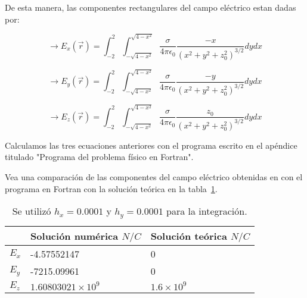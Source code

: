 De esta manera, las componentes rectangulares del campo eléctrico estan dadas por:

\begin{equation}
    \longrightarrow
    E_{x} (\vec{r}) =  
    \displaystyle\int_{-2}^{2} 
    \displaystyle\int_{- \sqrt{4 - x^2} }^{\sqrt{4 - x^2}}
    \frac{\sigma}{4\pi \epsilon_0}
    \frac{ -x }{\left( x^2 + y^2 + z_{0}^{2} \right)^{3/2}} dy dx
\end{equation}

\begin{equation}
    \longrightarrow
    E_{y} (\vec{r}) =  
    \displaystyle\int_{-2}^{2} 
    \displaystyle\int_{- \sqrt{4 - x^2} }^{\sqrt{4 - x^2}}
    \frac{\sigma}{4\pi \epsilon_0}
    \frac{ -y }{\left( x^2 + y^2 + z_{0}^{2} \right)^{3/2}} dy dx
\end{equation}

\begin{equation}
    \longrightarrow
    E_{z} (\vec{r}) =  
    \displaystyle\int_{-2}^{2} 
    \displaystyle\int_{- \sqrt{4 - x^2} }^{\sqrt{4 - x^2}}
    \frac{\sigma}{4\pi \epsilon_0}
    \frac{ z_0 }{\left( x^2 + y^2 + z_{0}^{2} \right)^{3/2}} dy dx
\end{equation}

Calculamos las tres ecuaciones anteriores con el programa escrito en el apéndice titulado "Programa del problema físico en Fortran".


Vea una comparación de las componentes del campo eléctrico obtenidas en con el programa en Fortran con la solución teórica en la tabla~\ref{table_results}.

\begin{table}[hbt!]
    \begin{threeparttable}
    \begin{tabular}{lll}
    \toprule
    \headrow & Solución numérica $N/C$ & Solución teórica $N/C$ \\
    \midrule
    $E_x$ & -4.57552147 & 0 \\ 
    \midrule
    $E_y$ & -7215.09961 & 0 \\ 
    \midrule
    $E_z$ & $1.60803021 \times 10^9$ & $1.6 \times 10^9$ \\ 
    \bottomrule
    \end{tabular}
    \caption{Se utilizó $h_x = 0.0001$ y $h_y = 0.0001$ para la integración.}
    \label{table_results}
\end{threeparttable}
\end{table}